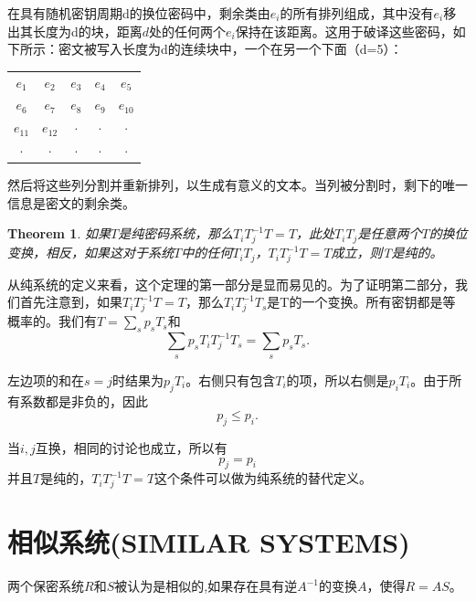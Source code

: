 \documentclass[]{article}
\newtheorem{theorem}{Theorem}
\begin{document}
在具有随机密钥周期d的换位密码中，剩余类由$e_i$的所有排列组成，其中没有$e_i$移出其长度为d的块，距离$d$处的任何两个$e_i$保持在该距离。这用于破译这些密码，如下所示：密文被写入长度为d的连续块中，一个在另一个下面（d=5）：\par
\begin{center}
	\begin{tabular}{c c c c c }
		
		$e_1$& $e_2$ & $e_3$ & $e_4$ & $e_5$ \\ 
		
		$e_6$& $e_7$ & $e_8$ & $e_9$ & $e_{10}$ \\ 
		
		$e_{11}$& $e_{12}$ & $\cdot$ & $\cdot$ & $\cdot$ \\ 
		
		$\cdot$& $\cdot$ & $\cdot$ & $\cdot$ & $\cdot$ \\ 
		
	\end{tabular} 
\end{center}

然后将这些列分割并重新排列，以生成有意义的文本。当列被分割时，剩下的唯一信息是密文的剩余类。

\begin{theorem}
	如果$T$是纯密码系统，那么$T_i T^{-1}_j T= T$，此处$T_iT_j$是任意两个$T$的换位变换，相反，如果这对于系统$T$中的任何$T_iT_j$，$T_i T^{-1}_j T= T$成立，则T是纯的。
\end{theorem}

从纯系统的定义来看，这个定理的第一部分是显而易见的。为了证明第二部分，我们首先注意到，如果$T_i T^{-1}_j T= T$，那么$T_i T^{-1}_j T_s$是T的一个变换。所有密钥都是等概率的。我们有$T=\sum_{s}p_sT_s$和
\[\sum_{s} p_sT_iT^{-1}_jT_s = \sum_{s}p_sT_s.\]

左边项的和在$s=j$时结果为$p_jT_i$。右侧只有包含$T_i$的项，所以右侧是$p_iT_i$。由于所有系数都是非负的，因此
\[p_j\leq p_i.\]

当$i,j$互换，相同的讨论也成立，所以有
\[p_j = p_i\]
并且$T$是纯的，$T_iT^{-1}_jT=T$这个条件可以做为纯系统的替代定义。

\newpage
%   
%

\section{相似系统(SIMILAR SYSTEMS)}

两个保密系统$R$和$S$被认为是相似的,如果存在具有逆$A^{-1}$的变换$A$，使得$R=AS$。
\end{document}
